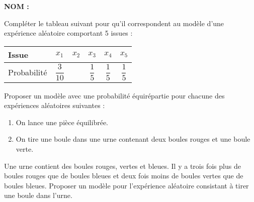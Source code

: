 \documentclass[a4paper,11pt,DIV15,BCOR0mm]{scrartcl}
\begin{document}
\newcommand{\vv}[1]{\vect{#1}}
\noindent\textbf{NOM : }

\begin{exercice}
Compléter le tableau suivant pour qu'il correspondent au modèle d'une expérience
aléatoire comportant 5 issues :
\begin{center}
\renewcommand{\arraystretch}{2}
\begin{tabular}{p{2.5cm}|c|c|c|c|c}
Issue & $x_1$ & $x_2$ & $x_3$ & $x_4$ & $x_5$ \\\hline
Probabilité & $\dfrac{3}{10}$ & & $\dfrac{1}{5}$ & $\dfrac{1}{5}$ & $\dfrac{1}{5}$
\end{tabular}
\end{center}
\end{exercice}

\begin{exercice}
Proposer un modèle avec une
probabilité équirépartie pour chacune des expériences aléatoires suivantes :

\begin{enumerate}
  \item On lance une pièce équilibrée.
  \vfill
  \item On tire une boule dans une urne contenant deux boules rouges et 
  une boule verte.
  \vfill
\end{enumerate}

\end{exercice}


\begin{exercice}
Une urne contient des boules rouges, vertes et bleues. Il y a trois fois plus de boules
rouges que de boules bleues et deux fois moins de boules vertes que de boules bleues.
Proposer un modèle pour l'expérience aléatoire consistant à tirer une boule dans l'urne. 
\end{exercice}
\vfill
\end{document}
